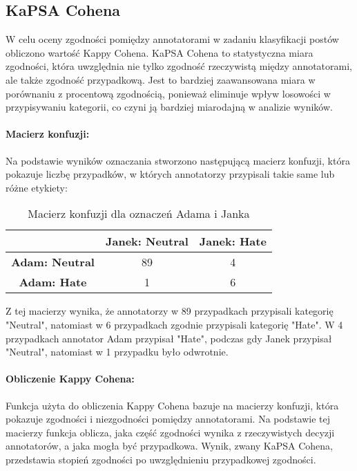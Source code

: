 \documentclass[12pt]{article}
\begin{document}
\subsection{KaPSA Cohena}

W celu oceny zgodności pomiędzy annotatorami w zadaniu klasyfikacji postów obliczono wartość Kappy Cohena. KaPSA Cohena to statystyczna miara zgodności, która uwzględnia nie tylko zgodność rzeczywistą między annotatorami, ale także zgodność przypadkową. Jest to bardziej zaawansowana miara w porównaniu z procentową zgodnością, ponieważ eliminuje wpływ losowości w przypisywaniu kategorii, co czyni ją bardziej miarodajną w analizie wyników.

\paragraph{Macierz konfuzji:}
Na podstawie wyników oznaczania stworzono następującą macierz konfuzji, która pokazuje liczbę przypadków, w których annotatorzy przypisali takie same lub różne etykiety:

\begin{table}[h!]
\centering
\begin{tabular}{|c|c|c|}
\hline
           & \textbf{Janek: Neutral} & \textbf{Janek: Hate} \\ \hline
\textbf{Adam: Neutral} & 89                      & 4                   \\ \hline
\textbf{Adam: Hate}    & 1                       & 6                   \\ \hline
\end{tabular}
\caption{Macierz konfuzji dla oznaczeń Adama i Janka}
\end{table}

Z tej macierzy wynika, że annotatorzy w 89 przypadkach przypisali kategorię "Neutral", natomiast w 6 przypadkach zgodnie przypisali kategorię "Hate". W 4 przypadkach annotator Adam przypisał "Hate", podczas gdy Janek przypisał "Neutral", natomiast w 1 przypadku było odwrotnie.

\paragraph{Obliczenie Kappy Cohena:}
Funkcja użyta do obliczenia Kappy Cohena bazuje na macierzy konfuzji, która pokazuje zgodności i niezgodności pomiędzy annotatorami. Na podstawie tej macierzy funkcja oblicza, jaka część zgodności wynika z rzeczywistych decyzji annotatorów, a jaka mogła być przypadkowa. Wynik, zwany KaPSA Cohena, przedstawia stopień zgodności po uwzględnieniu przypadkowej zgodności.
\end{document}
